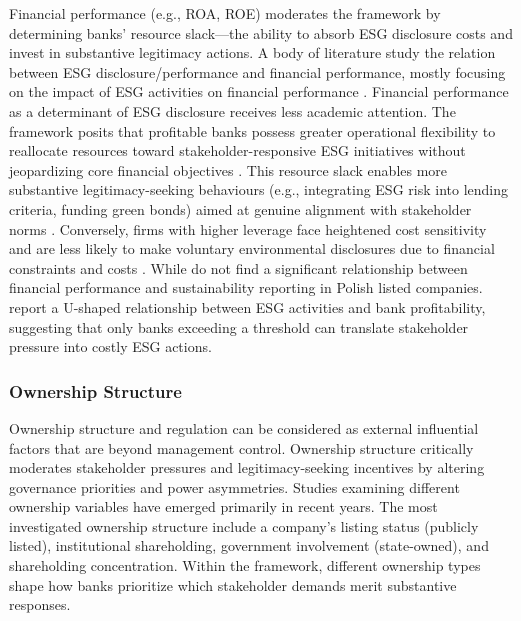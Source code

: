 \documentclass[
  authoryear]{elsarticle}
\begin{document}
Financial performance (e.g., ROA, ROE) moderates the framework by
determining banks' \hspace{0pt}resource slack---the ability to absorb
ESG disclosure costs and invest in substantive legitimacy actions. A
body of literature study the relation between ESG disclosure/performance
and financial performance, mostly focusing on the impact of ESG
activities on financial performance
\citep{FAVINO2019, BUALLAY2019, DAMATO2020, ABDI2022, LAMANDA2024}.
Financial performance as a determinant of ESG disclosure receives less
academic attention. The framework posits that profitable banks possess
greater operational flexibility to reallocate resources toward
stakeholder-responsive ESG initiatives without jeopardizing core
financial objectives \citep{HADDOCK2005, LIU2009, GAMERSCHLAG2011}. This
resource slack enables more substantive legitimacy-seeking behaviours
(e.g., integrating ESG risk into lending criteria, funding green bonds)
aimed at genuine alignment with stakeholder norms \citep{AGUINIS2012}.
Conversely, firms with higher leverage face heightened cost sensitivity
and are less likely to make voluntary environmental disclosures due to
financial constraints and costs \citep{BRAMMER2008}. While
\citet{DYDUCH2017} do not find a significant relationship between
financial performance and sustainability reporting in Polish listed
companies. \citet{YUEN2022} report a U-shaped relationship between ESG
activities and bank profitability, suggesting that only banks exceeding
a threshold can translate stakeholder pressure into costly ESG actions.

\subsubsection{Ownership Structure}\label{ownership-structure}

Ownership structure and regulation can be considered as external
influential factors that are beyond management control. Ownership
structure critically moderates stakeholder pressures and
legitimacy-seeking incentives by altering governance priorities and
power asymmetries. Studies examining different ownership variables have
emerged primarily in recent years. The most investigated ownership
structure include a company's listing status (publicly listed),
institutional shareholding, government involvement (state-owned), and
shareholding concentration. Within the framework, different ownership
types shape how banks prioritize which stakeholder demands merit
substantive responses.
\end{document}
